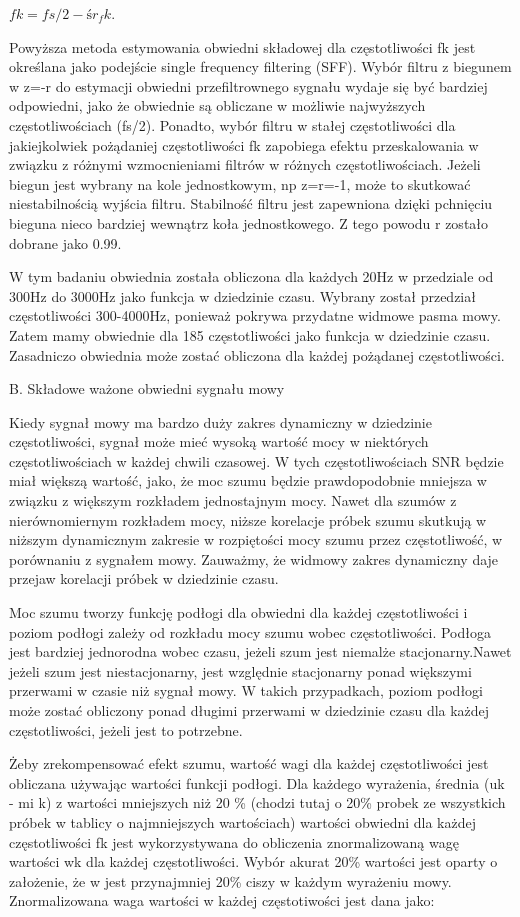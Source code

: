 \documentclass[eng,printmode]{mgr}
\begin{document}
 $fk = fs/2 - śr_fk.$
 
 
 Powyższa metoda estymowania obwiedni składowej dla częstotliwości fk jest określana jako podejście single frequency filtering (SFF). Wybór filtru z biegunem w z=-r do estymacji obwiedni przefiltrownego sygnału wydaje się być bardziej odpowiedni, jako że obwiednie są obliczane w możliwie najwyższych częstotliwościach (fs/2). Ponadto, wybór filtru w stałej częstotliwości dla jakiejkolwiek pożądaniej częstotliwości fk zapobiega efektu przeskalowania w związku z różnymi wzmocnieniami filtrów w różnych częstotliwościach. Jeżeli biegun jest wybrany na kole jednostkowym, np z=r=-1, może to skutkować niestabilnością wyjścia filtru. Stabilność filtru jest zapewniona dzięki pchnięciu bieguna nieco bardziej wewnątrz koła jednostkowego. Z tego powodu r zostało dobrane jako 0.99.
 
 W tym badaniu obwiednia została obliczona dla każdych 20Hz w przedziale od 300Hz do 3000Hz jako funkcja w dziedzinie czasu. Wybrany został przedział częstotliwości 300-4000Hz, ponieważ pokrywa przydatne widmowe pasma mowy. Zatem mamy obwiednie dla 185 częstotliwości jako funkcja w dziedzinie czasu. Zasadniczo obwiednia może zostać obliczona dla każdej pożądanej częstotliwości.
 
 
 B. Składowe ważone obwiedni sygnału mowy
 
 Kiedy sygnał mowy ma bardzo duży zakres dynamiczny w dziedzinie częstotliwości, sygnał może mieć wysoką wartość mocy w niektórych częstotliwościach w każdej chwili czasowej. W tych częstotliwościach SNR będzie miał większą wartość, jako, że moc szumu będzie prawdopodobnie mniejsza w związku z większym rozkładem jednostajnym mocy. Nawet dla szumów z nierównomiernym rozkładem mocy, niższe korelacje próbek szumu skutkują w niższym dynamicznym zakresie w rozpiętości mocy szumu przez częstotliwość, w porównaniu z sygnałem mowy. Zauważmy, że widmowy zakres dynamiczny daje przejaw korelacji próbek w dziedzinie czasu. 
 
 Moc szumu tworzy funkcję podłogi dla obwiedni dla każdej częstotliwości i poziom podłogi zależy od rozkładu mocy szumu wobec częstotliwości. Podłoga jest bardziej jednorodna wobec czasu, jeżeli szum jest niemalże stacjonarny.Nawet jeżeli szum jest niestacjonarny, jest względnie stacjonarny ponad większymi przerwami w czasie niż sygnał mowy. W takich przypadkach, poziom podłogi może zostać obliczony ponad długimi przerwami w dziedzinie czasu dla każdej częstotliwości, jeżeli jest to potrzebne.
 
 Żeby zrekompensować efekt szumu, wartość wagi dla każdej częstotliwości jest obliczana używając wartości funkcji podłogi. Dla każdego wyrażenia, średnia (uk - mi k) z wartości mniejszych niż 20 \% (chodzi tutaj o 20\% probek ze wszystkich próbek w tablicy o najmniejszych wartościach) wartości obwiedni dla każdej częstotliwości fk jest wykorzystywana do obliczenia znormalizowaną wagę wartości wk dla każdej częstotliwości. Wybór akurat 20\% wartości jest oparty o założenie, że w jest przynajmniej 20\% ciszy w każdym wyrażeniu mowy. Znormalizowana waga wartości w każdej częstotiwości jest dana jako:
 
\end{document}

